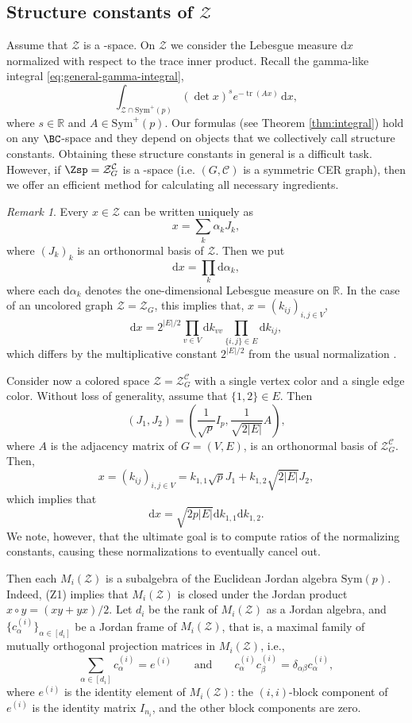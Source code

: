 \documentclass[12pt]{amsart}
\theoremstyle{plain}
\theoremstyle{definition}
\theoremstyle{remark}
\newtheorem{remark}[theorem]{Remark}
\newcommand{\R}{\mathbb{R}}
\newcommand{\1}{\mathbf{1}}
\newcommand{\dd}{\mathrm{d}}
\newcommand{\tr}{\operatorname{tr}}
\newcommand{\coloredZ}{\mathcal{Z}_{G}^{\mathcal{C}}}
\begin{document}
\subsection{Structure constants of \texorpdfstring{$\mathcal{Z}$}{Z}}\label{sec:structure_constants}

Assume that $\mathcal{Z}$ is a \BC-space. On $\mathcal{Z}$ we consider the Lebesgue measure $\dd x$ normalized with respect to the trace inner product.
Recall the gamma-like integral \eqref{eq:general-gamma-integral},
\[
\int_{\mathcal{Z} \cap \mathrm{Sym}^+(p)}(\det x)^s  e^{- \tr(Ax) } \,\dd x,
\]
where $s\in\R$ and $A\in\mathrm{Sym}^+(p)$. Our formulas (see Theorem \ref{thm:integral}) hold on any $\BC$-space and they depend on objects that we collectively call structure constants. Obtaining these structure constants in general is a difficult task. However, if $\Zsp=\coloredZ$ is a \cBC-space (i.e. $(G,\mathcal{C})$ is a symmetric CER graph), then we offer an efficient method for calculating all necessary ingredients. 

 \begin{remark}\label{rem:Leb} 
 Every $x\in\mathcal{Z}$ can be written  uniquely as 
\[
x = \sum_{k} \alpha_k J_k,
\]
where $(J_k)_k$ is an orthonormal basis of $\mathcal{Z}$. Then we put
\[
\dd x = \prod_k \dd \alpha_k,
\]
where each $\dd\alpha_k$ denotes the one-dimensional Lebesgue measure on $\R$.
In the case of an uncolored graph $\mathcal{Z}=\mathcal{Z}_G$, this implies that, $x=(k_{ij})_{i,j\in V}$,
\[
\dd x = 2^{|E|/2} \prod_{v\in V} \dd k_{vv}\prod_{\{i,j\}\in E} \dd k_{ij},
\]
which differs by the multiplicative constant $2^{|E|/2}$ from the usual normalization \citep{A-KM05,ULR18,MML23}.

Consider now a colored space $\mathcal{Z}=\coloredZ$ with a single vertex color and a single edge color. Without loss of generality, assume that $\{1,2\}\in E$. Then 
\[
(J_1,J_2) = \left(\frac{1}{\sqrt{p}} I_p, \frac{1}{\sqrt{2|E|}}A\right),
\]
where $A$ is the adjacency matrix of $G=(V,E)$, is an orthonormal basis of $\coloredZ$. Then, 
\[
x = ( k_{ij})_{i,j\in V} = k_{1,1}\sqrt{p} J_1 + k_{1,2} \sqrt{2|E|} J_2, 
\]
which implies that 
\[
\dd x = \sqrt{2 p |E|} \dd k_{1,1} \dd k_{1,2}. 
\]
We note, however, that the ultimate goal is to compute ratios of the normalizing constants, causing these normalizations to eventually cancel out.
\end{remark}

Then each $M_i(\mathcal{Z})$ is a subalgebra of the Euclidean Jordan algebra 
 $\mathrm{Sym}(p)$. Indeed, (Z1) implies that $M_i(\mathcal{Z})$ is closed under the Jordan product $x\circ y=(xy+yx)/2$. 
Let $d_i$ be the rank of $M_i(\mathcal{Z})$ as a Jordan algebra,
 and $\{ c^{(i)}_{\alpha} \}_{\alpha\in[d_i]}$ be a Jordan frame of $M_i(\mathcal{Z})$,
 that is, a maximal family of mutually orthogonal projection matrices in $M_i(\mathcal{Z})$, i.e.,
 \[
 \sum_{\alpha\in[d_i]} c_\alpha^{(i)}= e^{(i)}\qquad\mbox{and}\qquad c_\alpha^{(i)}c_\beta^{(i)}=\delta_{\alpha\beta} c_\alpha^{(i)},
 \]
 where $e^{(i)}$ is the identity element of $M_i(\mathcal{Z})$: the $(i,i)$-block component of $e^{(i)}$ is the identity matrix $I_{n_i}$,
 and the other block components are zero.
\end{document}
